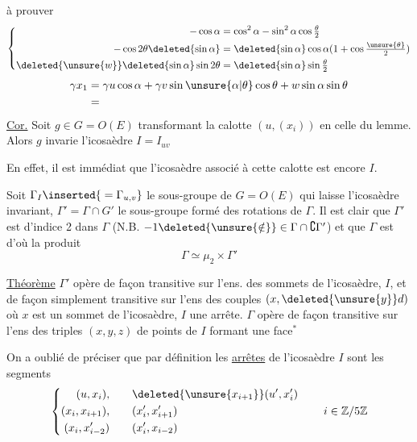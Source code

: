 à prouver
\[
\left\{\begin{aligned}
-\cos\alpha&=\cos^2\alpha-\sin^2\alpha\cos\tfrac{\theta}{2}\\
-\cos2\theta\deleted{\sin\alpha}&=\deleted{\sin\alpha}\cos\alpha(1+\cos\tfrac{\unsure{\theta}}2)\\
\deleted{\unsure{w}}\deleted{\sin\alpha}\sin2\theta&=\deleted{\sin\alpha}\sin\tfrac{\theta}{2}
\end{aligned}\right.
\]
\[
\begin{aligned}
\gamma x_1&=\gamma u\cos\alpha+\gamma v\sin\unsure{\alpha|\theta}\cos\theta+w\sin\alpha\sin\theta\\
&=
\end{aligned}
\]
\uline{Cor.} Soit  $g\in G=O(E)$ transformant la calotte $(u,(x_i))$ en celle du lemme. Alors $g$ invarie l'icosaèdre $I=I_{uv}$

En effet, il est immédiat que l'icosaèdre associé à cette  calotte est encore $I$.

Soit $\Gamma_I\inserted{{}=\Gamma_{u,v}}$ le sous-groupe de $G=O(E)$ qui laisse l'icosaèdre  invariant, $\Gamma'=\Gamma\cap G'$ le sous-groupe formé des rotations de $\Gamma$. Il est clair que $\Gamma'$ est d'indice 2 dans $\Gamma$ (N.B. $-1\deleted{\unsure{\notin}}\in\Gamma\cap\complement\Gamma'$) et que $\Gamma$ est d'où la produit
\[
\Gamma\simeq\mu_2\times\Gamma'
\]

\uline{Théorème} $\Gamma'$ opère de façon transitive sur l'ens. des sommets de l'icosaèdre, $I$, et de façon simplement transitive sur l'ens des couples $(x,\deleted{\unsure{y}}d)$ où $x$ est un sommet de l'icosaèdre, $I$ une arrête. $\Gamma$ opère de façon  transitive sur l'ens des triples $(x,y,z)$ de points de $I$ formant une face$^{*}$

On a oublié de préciser que par définition les \uline{arrêtes} de l'icosaèdre $I$ sont les  segments  
\[
\left\{\begin{aligned}
(u,x_i),&\qquad \deleted{\unsure{x_{i+1}}}(u',x'_i)\\
(x_i,x_{i+1}),&\qquad (x'_i,x'_{i+1})\\
(x_i,x'_{i-2})&\qquad (x'_i,x_{i-2})
\end{aligned}\right.\qquad i\in\mathbb Z/5\mathbb Z
\]


